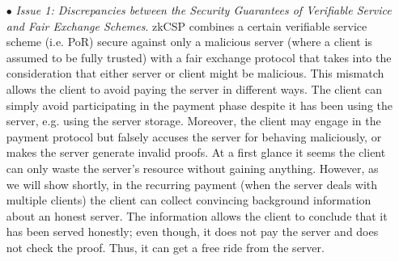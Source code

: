 \begin{itemize}


\item[$\bullet$]\textit{Issue 1: Discrepancies between the Security Guarantees of Verifiable  Service and Fair Exchange Schemes}. zkCSP combines a certain verifiable service scheme (i.e. PoR) secure against only a malicious server (where a client is assumed to be fully trusted) with a fair exchange protocol that takes into the consideration that either server or client might be malicious.  This mismatch allows the client to avoid paying the server in different ways. The client can simply avoid participating in the payment phase despite it has been using the server, e.g. using the server storage. Moreover, the client  may engage in the payment protocol but  falsely accuses the server for behaving maliciously, or  makes the server generate invalid proofs.  At a first glance it seems the client can only  waste the server's resource without gaining anything. However, as we will show shortly, in the recurring payment (when the server deals with multiple clients) the client  can collect  convincing background information about an honest server. The information   allows the client to conclude that it has been  served honestly; even though, it does not pay the server and does not check the proof. Thus, it can  get a free ride from the server. 















\end{itemize}
